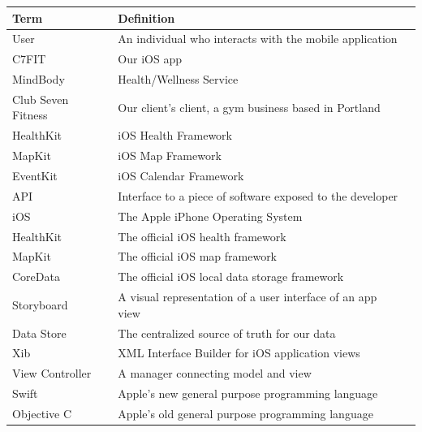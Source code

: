 \documentclass[letterpaper,10pt,titlepage]{article}
\begin{document}
\begin{center}
    \begin{tabular}{ | l | l | p{5cm} |}
    \hline
Term               & Definition                                               \\ \hline
User               & An individual who interacts with the mobile application  \\ \hline
C7FIT              & Our iOS app                                              \\ \hline
MindBody           & Health/Wellness Service                                  \\ \hline
Club Seven Fitness & Our client's client, a gym business based in Portland    \\ \hline
HealthKit          & iOS Health Framework                                     \\ \hline
MapKit             & iOS Map Framework                                        \\ \hline
EventKit           & iOS Calendar Framework                                   \\ \hline
API                & Interface to a piece of software exposed to the developer\\ \hline
iOS                & The Apple iPhone Operating System                        \\ \hline
HealthKit          & The official iOS health framework                        \\ \hline
MapKit             & The official iOS map framework                           \\ \hline
CoreData           & The official iOS local data storage framework            \\ \hline
Storyboard         & A visual representation of a user interface of an app view\\ \hline
Data Store         & The centralized source of truth for our data             \\ \hline
Xib                & XML Interface Builder for iOS application views          \\ \hline
View Controller    & A manager connecting model and view                      \\ \hline
Swift              & Apple's new general purpose programming language         \\ \hline
Objective C        & Apple's old general purpose programming language         \\ \hline

    \end{tabular}
\end{center}
\end{document}
